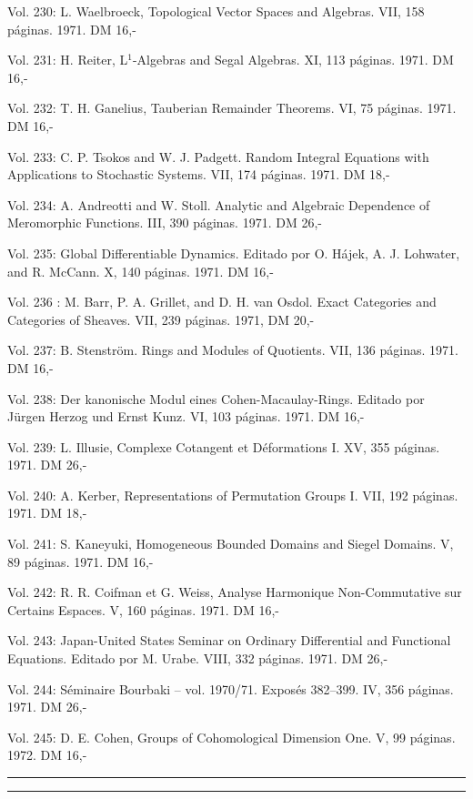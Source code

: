 Vol. 230: L. Waelbroeck, Topological Vector Spaces and Algebras. VII, 158 páginas. 1971. DM 16,-

Vol. 231: H. Reiter, L$^1$-Algebras and Segal Algebras. XI, 113 páginas. 1971. DM 16,-

Vol. 232: T. H. Ganelius, Tauberian Remainder Theorems. VI, 75 páginas. 1971. DM 16,-

Vol. 233: C. P. Tsokos and W. J. Padgett. Random Integral Equations with Applications to Stochastic Systems. VII, 174 páginas. 1971. DM 18,-

Vol. 234: A. Andreotti and W. Stoll. Analytic and Algebraic Dependence of Meromorphic Functions. III, 390 páginas. 1971. DM 26,-

Vol. 235: Global Differentiable Dynamics. Editado por O. Hájek, A. J. Lohwater, and R. McCann. X, 140 páginas. 1971. DM 16,-

Vol. 236 : M. Barr, P. A. Grillet, and D. H. van Osdol. Exact Categories and Categories of Sheaves. VII, 239 páginas. 1971, DM 20,-

Vol. 237: B. Stenström. Rings and Modules of Quotients. VII, 136 páginas. 1971. DM 16,-

Vol. 238: Der kanonische Modul eines Cohen-Macaulay-Rings. Editado por Jürgen Herzog und Ernst Kunz. VI, 103 páginas. 1971. DM 16,-

Vol. 239: L. Illusie, Complexe Cotangent et Déformations I. XV, 355 páginas. 1971. DM 26,-

Vol. 240: A. Kerber, Representations of Permutation Groups I. VII, 192 páginas. 1971. DM 18,-

Vol. 241: S. Kaneyuki, Homogeneous Bounded Domains and Siegel Domains. V, 89 páginas. 1971. DM 16,-

Vol. 242: R. R. Coifman et G. Weiss, Analyse Harmonique Non-Commutative sur Certains Espaces. V, 160 páginas. 1971. DM 16,-

Vol. 243: Japan-United States Seminar on Ordinary Differential and Functional Equations. Editado por M. Urabe. VIII, 332 páginas. 1971. DM 26,-

Vol. 244: Séminaire Bourbaki -- vol. 1970/71. Exposés 382--399. IV, 356 páginas. 1971. DM 26,-

Vol. 245: D. E. Cohen, Groups of Cohomological Dimension One. V, 99 páginas. 1972. DM 16,-

\noindent\rule{\linewidth}{0.4pt}



\noindent\rule{\linewidth}{0.4pt}

